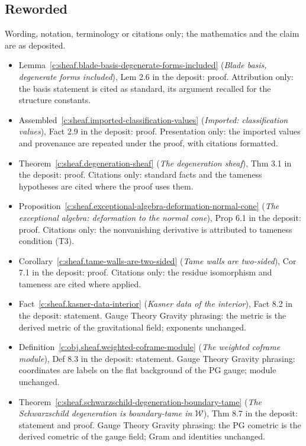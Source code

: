 \documentclass[11pt]{article}
\theoremstyle{definition}
\theoremstyle{plain}
\providecommand{\shW}{}\renewcommand{\shW}{\mathcal{W}}
\begin{document}
\subsection*{Reworded}
Wording, notation, terminology or citations only; the mathematics and the claim are as deposited.
\begin{itemize}\setlength{\itemsep}{2pt}
\item Lemma~\ref{c:sheaf.blade-basis-degenerate-forms-included} (\emph{Blade basis, degenerate forms included}), Lem 2.6 in the deposit: proof. Attribution only: the basis statement is cited as standard, its argument recalled for the structure constants.
\item Assembled~\ref{c:sheaf.imported-classification-values} (\emph{Imported: classification values}), Fact 2.9 in the deposit: proof. Presentation only: the imported values and provenance are repeated under the proof, with citations formatted.
\item Theorem~\ref{c:sheaf.degeneration-sheaf} (\emph{The degeneration sheaf}), Thm 3.1 in the deposit: proof. Citations only: standard facts and the tameness hypotheses are cited where the proof uses them.
\item Proposition~\ref{c:sheaf.exceptional-algebra-deformation-normal-cone} (\emph{The exceptional algebra: deformation to the normal cone}), Prop 6.1 in the deposit: proof. Citations only: the nonvanishing derivative is attributed to tameness condition (T3).
\item Corollary~\ref{c:sheaf.tame-walls-are-two-sided} (\emph{Tame walls are two-sided}), Cor 7.1 in the deposit: proof. Citations only: the residue isomorphism and tameness are cited where applied.
\item Fact~\ref{c:sheaf.kasner-data-interior} (\emph{Kasner data of the interior}), Fact 8.2 in the deposit: statement. Gauge Theory Gravity phrasing: the metric is the derived metric of the gravitational field; exponents unchanged.
\item Definition~\ref{c:obj.sheaf.weighted-coframe-module} (\emph{The weighted coframe module}), Def 8.3 in the deposit: statement. Gauge Theory Gravity phrasing: coordinates are labels on the flat background of the PG gauge; module unchanged.
\item Theorem~\ref{c:sheaf.schwarzschild-degeneration-boundary-tame} (\emph{The Schwarzschild degeneration is boundary-tame in $\shW$}), Thm 8.7 in the deposit: statement and proof. Gauge Theory Gravity phrasing: the PG cometric is the derived cometric of the gauge field; Gram and identities unchanged.

\end{itemize}
\end{document}
